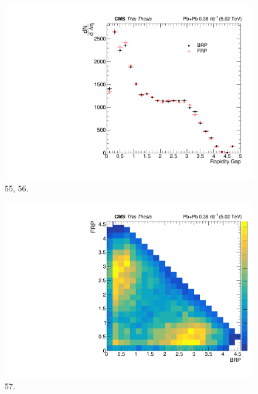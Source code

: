 \begin{figure}[h!]
\begin{centering}
\includegraphics[width=5in]{Chapter6/importfigs/55_56_thesis.pdf}
\par\end{centering}
\caption{55, 56. \label{fig:55_56}}
\end{figure}

\begin{figure}[h!]
\begin{centering}
\includegraphics[width=5in]{Chapter6/importfigs/57_thesis.pdf}
\par\end{centering}
\caption{57. \label{fig:57}}
\end{figure}

